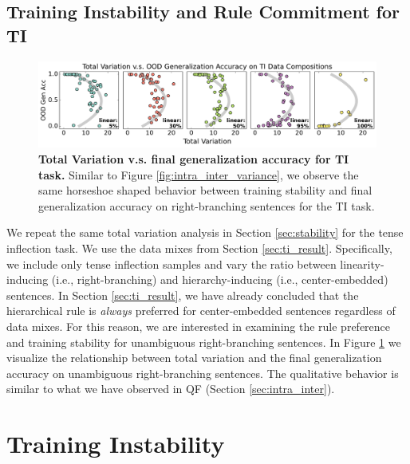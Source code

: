 \subsection{Training Instability and Rule Commitment for TI}
\label{appdx:tense_tv}
\begin{figure}[t]
    \centering
    \includegraphics[width=1.0\linewidth]{figures/intra_inter_inconsistency_D101.pdf}
    \caption{\textbf{Total Variation v.s. final generalization accuracy for TI task.} Similar to Figure \ref{fig:intra_inter_variance}, we observe the same horseshoe shaped behavior between training stability and final generalization accuracy on right-branching sentences for the TI task.
    }
    \label{fig:intra_inter_variance_tense}
\end{figure}
We repeat the same total variation analysis in Section \ref{sec:stability} for the tense inflection task. We use the data mixes from Section \ref{sec:ti_result}. Specifically, we include only tense inflection samples and vary the ratio between linearity-inducing (i.e., right-branching) and hierarchy-inducing (i.e., center-embedded) sentences. In Section \ref{sec:ti_result}, we have already concluded that the hierarchical rule is \textit{always} preferred for center-embedded sentences regardless of data mixes. For this reason, we are interested in examining the rule preference and training stability for unambiguous right-branching sentences.
In Figure \ref{fig:intra_inter_variance_tense} we visualize the relationship between total variation and the final generalization accuracy on unambiguous right-branching sentences. The qualitative behavior is similar to what we have observed in QF (Section \ref{sec:intra_inter}).

\section{Training Instability}
\label{appdx:training_instabilty}

